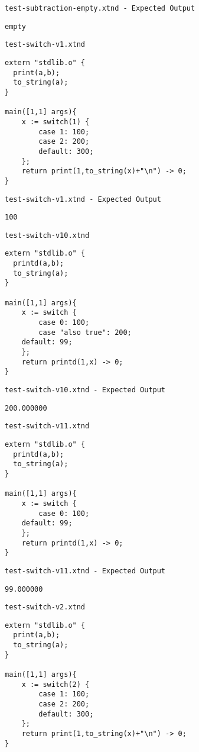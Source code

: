 \medskip \noindent \texttt{test-subtraction-empty.xtnd - Expected Output}


\begin{lstlisting}
empty
\end{lstlisting}


\medskip \noindent \texttt{test-switch-v1.xtnd}


\begin{lstlisting}
extern "stdlib.o" {
  print(a,b);
  to_string(a);
}

main([1,1] args){
	x := switch(1) {
		case 1: 100;
		case 2: 200;
		default: 300;
	};
	return print(1,to_string(x)+"\n") -> 0;
}
\end{lstlisting}


\medskip \noindent \texttt{test-switch-v1.xtnd - Expected Output}


\begin{lstlisting}
100
\end{lstlisting}


\medskip \noindent \texttt{test-switch-v10.xtnd}


\begin{lstlisting}
extern "stdlib.o" {
  printd(a,b);
  to_string(a);
}

main([1,1] args){
	x := switch {
		case 0: 100;
		case "also true": 200;
    default: 99;
	};
	return printd(1,x) -> 0;
}
\end{lstlisting}


\medskip \noindent \texttt{test-switch-v10.xtnd - Expected Output}


\begin{lstlisting}
200.000000
\end{lstlisting}


\medskip \noindent \texttt{test-switch-v11.xtnd}


\begin{lstlisting}
extern "stdlib.o" {
  printd(a,b);
  to_string(a);
}

main([1,1] args){
	x := switch {
		case 0: 100;
    default: 99;
	};
	return printd(1,x) -> 0;
}
\end{lstlisting}


\medskip \noindent \texttt{test-switch-v11.xtnd - Expected Output}


\begin{lstlisting}
99.000000
\end{lstlisting}


\medskip \noindent \texttt{test-switch-v2.xtnd}


\begin{lstlisting}
extern "stdlib.o" {
  print(a,b);
  to_string(a);
}

main([1,1] args){
	x := switch(2) {
		case 1: 100;
		case 2: 200;
		default: 300;
	};
	return print(1,to_string(x)+"\n") -> 0;
}
\end{lstlisting}


